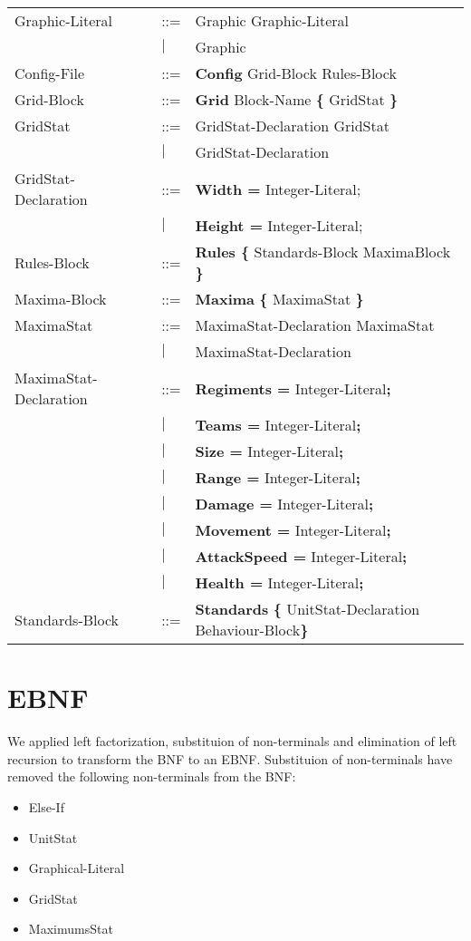 \begin{center}
\begin{longtable}{l l p{7cm}}
Graphic-Literal				&	::=	&Graphic Graphic-Literal\\
							&$\mid$	&Graphic\\
Config-File					&	::=	&{\bf Config} Grid-Block Rules-Block\\
Grid-Block					&	::=	&{\bf Grid} Block-Name	 {\bf \{} GridStat \bf{\}}\\
GridStat					&	::=	&GridStat-Declaration GridStat\\
							&$\mid$	&GridStat-Declaration \\
GridStat-Declaration		&	::=	&{\bf Width = } Integer-Literal;\\
							&$\mid$	&{\bf Height = } Integer-Literal;\\
Rules-Block					&	::=	&{\bf Rules \{ } Standards-Block MaximaBlock {\bf \} }\\
Maxima-Block				&	::=	&{\bf Maxima} {\bf \{} MaximaStat {\bf \}} \\
MaximaStat				&	::=		&MaximaStat-Declaration MaximaStat\\
							&$\mid$	&MaximaStat-Declaration\\
MaximaStat-Declaration	&	::=	&{\bf Regiments = } Integer-Literal{\bf ;}\\
							&$\mid$	&{\bf Teams = } Integer-Literal{\bf ;}\\
							&$\mid$	&{\bf Size = } Integer-Literal{\bf ;}\\
							&$\mid$	&{\bf Range = } Integer-Literal{\bf ;}\\
							&$\mid$	&{\bf Damage = } Integer-Literal{\bf ;}\\
							&$\mid$	&{\bf Movement = } Integer-Literal{\bf ;}\\
							&$\mid$	&{\bf AttackSpeed = } Integer-Literal{\bf ;}\\
							&$\mid$	&{\bf Health = } Integer-Literal{\bf ;}\\
Standards-Block				&	::=	&{\bf Standards} {\bf \{ } UnitStat-Declaration Behaviour-Block\bf{\} }\\
\end{longtable}
\end{center}

\chapter{EBNF}
\label{app:ebnf}
	We applied left factorization, substituion of non-terminals 
	and elimination of left recursion  to transform the BNF to an EBNF.
	Substituion of non-terminals have removed the following non-terminals from the BNF: \\
	\begin{itemize}
		\item Else-If
		\item UnitStat
		\item Graphical-Literal
		\item GridStat
		\item MaximumsStat
	\end{itemize}
	
